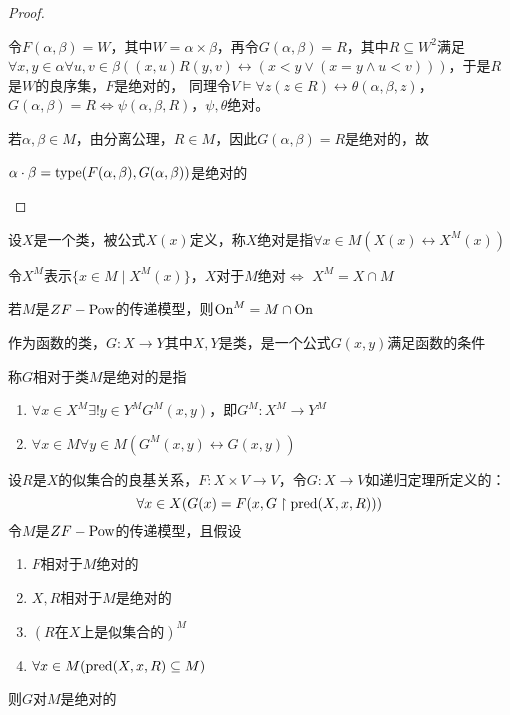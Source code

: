 \documentclass[11pt]{article}
\begin{document}
\begin{proof}
\begin{enumerate}
令\(F(\alpha,\beta)=W\)，其中\(W=\alpha\times\beta\)，再令\(G(\alpha,\beta)=R\)，其中\(R\subseteq W^2\)满足
\(\forall x,y\in\alpha\forall u,v\in\beta((x,u)R(y,v)\leftrightarrow(x<y\vee(x=y\wedge u<v)))\)，于是\(R\)是\(W\)的良序集，\(F\)是绝对的，
同理令\(V\vDash\forall z(z\in R)\leftrightarrow\theta(\alpha,\beta,z)\)，\(G(\alpha,\beta)=R\Leftrightarrow\psi(\alpha,\beta,R)\)，\(\psi,\theta\)绝对。

若\(\alpha,\beta\in M\)，由分离公理，\(R\in M\)，因此\(G(\alpha,\beta)=R\)是绝对的，故

\(\alpha\cdot\beta=\operatorname{type}(F(\alpha,\beta),G(\alpha,\beta))\)是绝对的
\end{enumerate}
\end{proof}

设\(X\)是一个类，被公式\(X(x)\)定义，称\(X\)绝对是指\(\forall x\in M(X(x)\leftrightarrow X^M(x))\)

令\(X^M\)表示\(\{x\in M\mid X^M(x)\}\)，\(X\)对于\(M\)绝对\(\Leftrightarrow\) \(X^M=X\cap M\)

若\(M\)是\(ZF-\operatorname{Pow}\)的传递模型，则\(\operatorname{On}^M=M\cap\operatorname{On}\)

作为函数的类，\(G:X\to Y\)其中\(X,Y\)是类，是一个公式\(G(x,y)\)满足函数的条件

称\(G\)相对于类\(M\)是绝对的是指
\begin{enumerate}
\item \(\forall x\in X^M\exists!y\in Y^MG^M(x,y)\)，即\(G^M:X^M\to Y^M\)
\item \(\forall x\in M\forall y\in M(G^M(x,y)\leftrightarrow G(x,y))\)
\end{enumerate}


\begin{theorem}[]
设\(R\)是\(X\)的似集合的良基关系，\(F:X\times V\to V\)，令\(G:X\to V\)如递归定理所定义的：
\begin{equation*}
\forall x\in X(G(x)=F(x,G\upharpoonright\text{pred}(X,x,R)))
\end{equation*}
令\(M\)是\(ZF-\operatorname{Pow}\)的传递模型，且假设
\begin{enumerate}
\item \(F\)相对于\(M\)绝对的
\item \(X,R\)相对于\(M\)是绝对的
\item \((R\text{在$X$上是似集合的})^M\)
\item \(\forall x\in M(\text{pred}(X,x,R)\subseteq M)\)
\end{enumerate}
则\(G\)对\(M\)是绝对的
\end{theorem}
\end{document}
